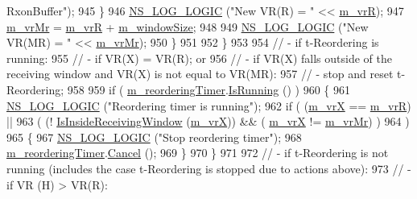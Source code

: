 \begin{DoxyCode}
{       RxonBuffer"});
945                 \}
946               \hyperlink{group__logging_ga88acd260151caf2db9c0fc84997f45ce}{NS\_LOG\_LOGIC} (\textcolor{stringliteral}{"New VR(R)  = "} << \hyperlink{classns3_1_1LteRlcAm_aeec4bcfab747723421c68ed38feea081}{m\_vrR});
947               \hyperlink{classns3_1_1LteRlcAm_a19fa34df429b9b277b610ae1d8df0005}{m\_vrMr} = \hyperlink{classns3_1_1LteRlcAm_aeec4bcfab747723421c68ed38feea081}{m\_vrR} + \hyperlink{classns3_1_1LteRlcAm_a2c1a56eda5de4f0b8039117cd3af7c67}{m\_windowSize};
948 
949               \hyperlink{group__logging_ga88acd260151caf2db9c0fc84997f45ce}{NS\_LOG\_LOGIC} (\textcolor{stringliteral}{"New VR(MR) = "} << \hyperlink{classns3_1_1LteRlcAm_a19fa34df429b9b277b610ae1d8df0005}{m\_vrMr});
950             \}
951 
952         \}
953 
954       \textcolor{comment}{// - if t-Reordering is running:}
955       \textcolor{comment}{//     - if VR(X) = VR(R); or}
956       \textcolor{comment}{//     - if VR(X) falls outside of the receiving window and VR(X) is not equal to VR(MR):}
957       \textcolor{comment}{//         - stop and reset t-Reordering;}
958 
959       \textcolor{keywordflow}{if} ( \hyperlink{classns3_1_1LteRlcAm_adfc371376cf9dc771d2b2736be16550c}{m\_reorderingTimer}.\hyperlink{classns3_1_1EventId_aabf8476d1a080c199ea0c6aa9ccea372}{IsRunning} () )
960         \{
961           \hyperlink{group__logging_ga88acd260151caf2db9c0fc84997f45ce}{NS\_LOG\_LOGIC} (\textcolor{stringliteral}{"Reordering timer is running"});
962           \textcolor{keywordflow}{if} ( (\hyperlink{classns3_1_1LteRlcAm_aafbeed1507367d3bcb51a3a5f7d3aa57}{m\_vrX} == \hyperlink{classns3_1_1LteRlcAm_aeec4bcfab747723421c68ed38feea081}{m\_vrR}) ||
963                ( (! \hyperlink{classns3_1_1LteRlcAm_a278f6dd09bf7c65bd85fab4ece7ff11a}{IsInsideReceivingWindow} (\hyperlink{classns3_1_1LteRlcAm_aafbeed1507367d3bcb51a3a5f7d3aa57}{m\_vrX})) && (
      \hyperlink{classns3_1_1LteRlcAm_aafbeed1507367d3bcb51a3a5f7d3aa57}{m\_vrX} != \hyperlink{classns3_1_1LteRlcAm_a19fa34df429b9b277b610ae1d8df0005}{m\_vrMr}) )
964              )
965             \{
967               \hyperlink{group__logging_ga88acd260151caf2db9c0fc84997f45ce}{NS\_LOG\_LOGIC} (\textcolor{stringliteral}{"Stop reordering timer"});
968               \hyperlink{classns3_1_1LteRlcAm_adfc371376cf9dc771d2b2736be16550c}{m\_reorderingTimer}.\hyperlink{classns3_1_1EventId_a993ae94e48e014e1afd47edb16db7a11}{Cancel} ();
969             \}
970         \}
971 
972       \textcolor{comment}{// - if t-Reordering is not running (includes the case t-Reordering is stopped due to actions above):}
973       \textcolor{comment}{//     - if VR (H) > VR(R):}

\end{DoxyCode}
